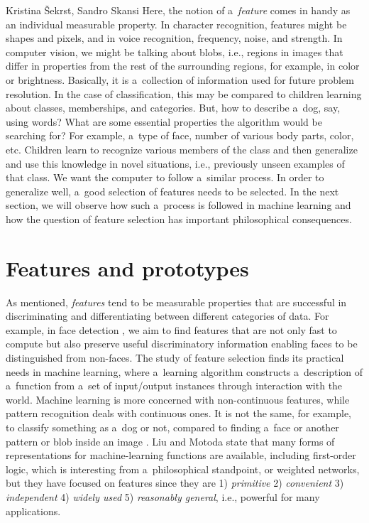 \begin{artengenv2auth}{Kristina Šekrst, Sandro Skansi}
Here, the notion of a~\textit{feature} comes in handy as an individual measurable property. In character recognition, features might be shapes and pixels, and in voice recognition, frequency, noise, and strength. In computer vision, we might be talking about blobs, i.e., regions in images that differ in properties from the rest of the surrounding regions, for example, in color or brightness. Basically, it is a~collection of information used for future problem resolution. In the case of classification, this may be compared to children learning about classes, memberships, and categories. But, how to describe a~dog, say, using words? What are some essential properties the algorithm would be searching for? For example, a~type of face, number of various body parts, color, etc. Children learn to recognize various members of the class and then generalize and use this knowledge in novel situations, i.e., previously unseen examples of that class. We want the computer to follow a~similar process. In order to generalize well, a~good selection of features needs to be selected. In the next section, we will observe how such a~process is followed in machine learning and how the question of feature selection has important philosophical consequences.

\section{Features and prototypes}
As mentioned, \textit{features} tend to be measurable properties that are successful in discriminating and differentiating between different categories of data. For example, in face detection
\parencite[][p.3]{bishop_pattern_2006}, %
 we aim to find features that are not only fast to compute but also preserve useful discriminatory information enabling faces to be distinguished from non-faces. The study of feature selection finds its practical needs in machine learning, where a~learning algorithm constructs a~description of a~function from a~set of input/output instances through interaction with the world. Machine learning is more concerned with non-continuous features, while pattern recognition deals with continuous ones. It is not the same, for example, to classify something as a~dog or not, compared to finding a~face or another pattern or blob inside an image 
\parencite[][p.2]{liu_feature_1998}. %
 Liu and Motoda 
\parencite*[][p.2]{liu_feature_1998} %
 state that many forms of representations for machine-learning functions are available, including first-order logic, which is interesting from a~philosophical standpoint, or weighted networks, but they have focused on features since they are 1) \textit{primitive} 2) \textit{convenient} 3) \textit{independent} 4) \textit{widely used} 5) \textit{reasonably general}, i.e., powerful for many applications.


\end{artengenv2auth}
